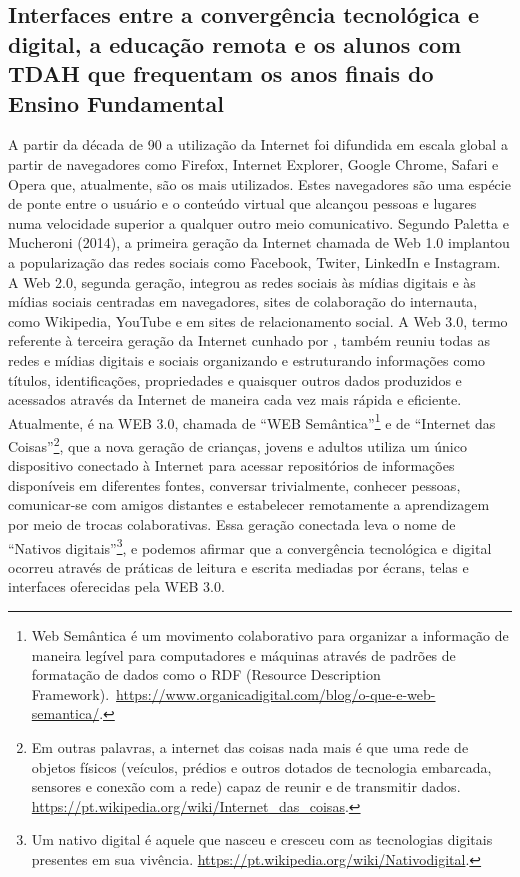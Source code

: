 \documentclass{textolivre}
\begin{document}
\subsection{Interfaces entre a convergência tecnológica e digital, a educação remota e os alunos com TDAH que frequentam os anos finais do Ensino Fundamental}\label{sec-interfaces}
A partir da década de 90 a utilização da Internet foi difundida em escala global a partir de navegadores como Firefox, Internet Explorer, Google Chrome, Safari e Opera que, atualmente, são os mais utilizados. Estes navegadores são uma espécie de ponte entre o usuário e o conteúdo virtual que alcançou pessoas e lugares numa velocidade superior a qualquer outro meio comunicativo. Segundo Paletta e Mucheroni (2014), a primeira geração da Internet chamada de Web 1.0 implantou a popularização das redes sociais como Facebook, Twiter, LinkedIn e Instagram. A Web 2.0, segunda geração, integrou as redes sociais às mídias digitais e às mídias sociais centradas em navegadores, sites de colaboração do internauta, como Wikipedia, YouTube e em sites de relacionamento social. A Web 3.0, termo referente à terceira geração da Internet cunhado por \textcite{markoff_entrepreneurs_2006}, também reuniu todas as redes e mídias digitais e sociais organizando e estruturando informações como títulos, identificações, propriedades e quaisquer outros dados produzidos e acessados através da Internet de maneira cada vez mais rápida e eficiente. Atualmente, é na WEB 3.0, chamada de “WEB Semântica”\footnote{Web Semântica é um movimento colaborativo para organizar a informação de maneira legível para computadores e máquinas através de padrões de formatação de dados como o RDF (Resource Description Framework). \url{https://www.organicadigital.com/blog/o-que-e-web-semantica/}.} e de “Internet das Coisas”\footnote{Em outras palavras, a internet das coisas nada mais é que uma rede de objetos físicos (veículos, prédios e outros dotados de tecnologia embarcada, sensores e conexão com a rede) capaz de reunir e de transmitir dados. \url{https://pt.wikipedia.org/wiki/Internet_das_coisas}.}, que a nova geração de crianças, jovens e adultos utiliza um único dispositivo conectado à Internet para acessar repositórios de informações disponíveis em diferentes fontes, conversar trivialmente, conhecer pessoas, comunicar-se com amigos distantes e estabelecer remotamente a aprendizagem por meio de trocas colaborativas.  Essa geração conectada leva o nome de “Nativos digitais”\footnote{Um nativo digital é aquele que nasceu e cresceu com as tecnologias digitais presentes em sua vivência. \url{https://pt.wikipedia.org/wiki/Nativodigital}.}, e podemos afirmar que a convergência tecnológica e digital ocorreu através de práticas de leitura e escrita mediadas por écrans, telas e interfaces oferecidas pela WEB 3.0. 
\end{document}

